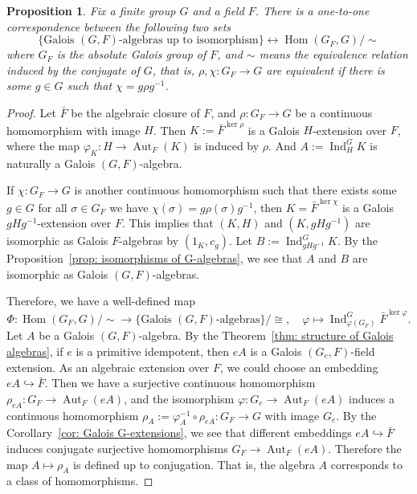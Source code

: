 \documentclass[12pt,a4paper]{amsart}
\numberwithin{equation}{section}%
\theoremstyle{plain}%
\newtheorem{proposition}[theorem]{Proposition}%
\theoremstyle{definition}%
\theoremstyle{remark}%
\begin{document}
	\begin{proposition}\label{prop: 1-1 correspondence for G-structured algebras}
		Fix a finite group $G$ and a field $F$.
		There is a one-to-one correspondence between the following two sets
		\begin{equation*}
			\{\text{Galois }(G,F)\text{-algebras up to isomorphism}\}\leftrightarrow\operatorname{Hom}(G_F,G)/\sim
		\end{equation*}
		where $G_F$ is the absolute Galois group of $F$, and $\sim$ means the equivalence relation induced by the conjugate of $G$, that is, $\rho,\chi:G_F\to G$ are equivalent if there is some $g\in G$ such that $\chi=g\rho g^{-1}$.
	\end{proposition}
	\begin{proof}
		Let $\bar{F}$ be the algebraic closure of $F$, and $\rho:G_F\to G$ be a continuous homomorphism with image $H$.
		Then $K:=\bar{F}^{\ker\rho}$ is a Galois $H$-extension over $F$, where the map $\varphi_K:H\to\operatorname{Aut}_F(K)$ is induced by $\rho$.
		And $A:=\operatorname{Ind}^G_H K$ is naturally a Galois $(G,F)$-algebra.
		
		If $\chi:G_F\to G$ is another continuous homomorphism such that there exists some $g\in G$ for all $\sigma\in G_F$ we have $\chi(\sigma)=g\rho(\sigma)g^{-1}$, then $K=\bar{F}^{\ker\chi}$ is a Galois $gHg^{-1}$-extension over $F$.
		This implies that $(K,H)$ and $(K,gHg^{-1})$ are isomorphic as Galois $F$-algebras by $(1_K,c_g)$.
		Let $B:=\operatorname{Ind}^G_{gHg^{-1}}K$.
		By the Proposition~\ref{prop: isomorphisms of G-algebras}, we see that $A$ and $B$ are isomorphic as Galois $(G,F)$-algebras.
		
		Therefore, we have a well-defined map
		\begin{equation*}
			\Phi:\operatorname{Hom}(G_F,G)/\sim\to\{\text{Galois }(G,F)\text{-algebras}\}/\cong,\quad\varphi\mapsto\operatorname{Ind}^G_{\varphi(G_F)}\bar{F}^{\ker\varphi}.
		\end{equation*} 
		Let $A$ be a Galois $(G,F)$-algebra.
		By the Theorem~\ref{thm: structure of Galois algebras}, if $e$ is a primitive idempotent, then $eA$ is a Galois $(G_e,F)$-field extension.
		As an algebraic extension over $F$, we could choose an embedding $eA\hookrightarrow\bar{F}$.
		Then we have a surjective continuous homomorphism $\rho_{eA}:G_F\to\operatorname{Aut}_F(eA)$,
		and the isomorphism $\varphi:G_e\to\operatorname{Aut}_F(eA)$ induces a continuous homomorphism $\rho_A:=\varphi_A^{-1}\circ\rho_{eA}:G_F\to G$ with image $G_e$.
		By the Corollary~\ref{cor: Galois G-extensions}, we see that different embeddings $eA\hookrightarrow\bar{F}$ induces conjugate surjective homomorphisms $G_F\to\operatorname{Aut}_F(eA)$.
		Therefore the map $A\mapsto\rho_A$ is defined up to conjugation.
		That is, the algebra $A$ corresponds to a class of homomorphisms.
		

\end{proof}
\end{document}

